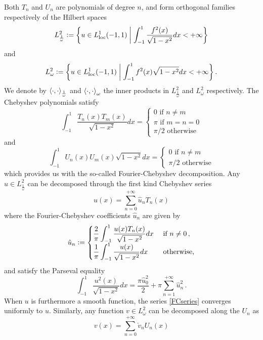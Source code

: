 \documentclass[a4paper]{article}
\begin{document}
Both $T_n$ and $U_n$ are polynomials of degree $n$, and form orthogonal families respectively of the Hilbert spaces 
$$L^2_{\frac{1}{\omega}} \mathrel{\mathop:}= \left\{u \in L^1_\textup{loc}(-1,1)\mathrel{}\middle|\mathrel{}\int_{-1}^{1} \dfrac{f^2(x)}{\sqrt{1 - x^2} }dx< + \infty\right\}$$
and 
$$L^2_{\omega} \mathrel{\mathop:}= \left\{u \in L^1_\textup{loc}(-1,1)\mathrel{}\middle|\mathrel{}\int_{-1}^{1} {f^2(x)}{\sqrt{1 - x^2} }dx< + \infty\right\}.$$
We denote by $\left\langle \cdot,\cdot\right\rangle_\frac{1}{\omega}$ and $\left\langle \cdot,\cdot\right\rangle_\omega$ the inner products in $L^2_{\frac{1}{\omega}}$ and $L^2_{\omega}$ respectively.
The Chebyshev polynomials satisfy
\begin{equation}
	\int_{-1}^1  \dfrac{T_n(x)T_m(x)}{\sqrt{1 - x^2} }dx = \left\{
	\begin{array}{l}
	0 \mbox{ if } n\ne m\\
	\pi \mbox{ if } m=n=0\\
	\pi/2 \mbox{ otherwise}
	\end{array} 
	\right.
\end{equation}
and
\begin{equation}
	\int_{-1}^1  U_n(x)U_m(x)\sqrt{1 - x^2} dx = \left\{
	\begin{array}{l}
	0 \mbox{ if } n\ne m\\
	\pi/2 \mbox{ otherwise}
	\end{array} 
	\right.
\end{equation}
which provides us with the so-called Fourier-Chebyshev decomposition. Any
$u\in L^2_{\frac{1}{\omega}}$ can be decomposed through the first kind Chebyshev series 
\begin{equation}
	u(x) = \sum_{n=0}^{+\infty} \hat{u}_n T_n(x)
	\label{FCseries}
\end{equation}
where the Fourier-Chebyshev coefficients $\hat{u}_n$ are given by 
\[ \hat{u}_n \mathrel{\mathop:}= \begin{cases}
\dfrac{2}{\pi}\displaystyle\int_{-1}^{1} \dfrac{u(x) T_n(x)}{\sqrt{1-x^2}}dx & \text{ if } n \neq 0\,,\\
\dfrac{1}{\pi}\displaystyle\int_{-1}^{1} \dfrac{u(x)}{\sqrt{1-x^2}}dx & \text{ otherwise,}\\
\end{cases}\]
and satisfy the Parseval equality
\[ \int_{-1}^{1} \frac{u^2(x)}{\sqrt{1-x^2}} dx =  \frac{\pi \hat{u}_0^2}{2} + \pi\sum_{n=1}^{+\infty}\hat{u}_n^2\,.\]
When $u$ is furthermore a smooth function, the series \eqref{FCseries} converges uniformly to $u$. Similarly, any 
function $v\in L^2_{\omega}$ can be decomposed along the $U_n$ as
\[ v(x) = \sum_{n=0}^{+\infty} \check{v}_n U_n(x)\]
\end{document}
